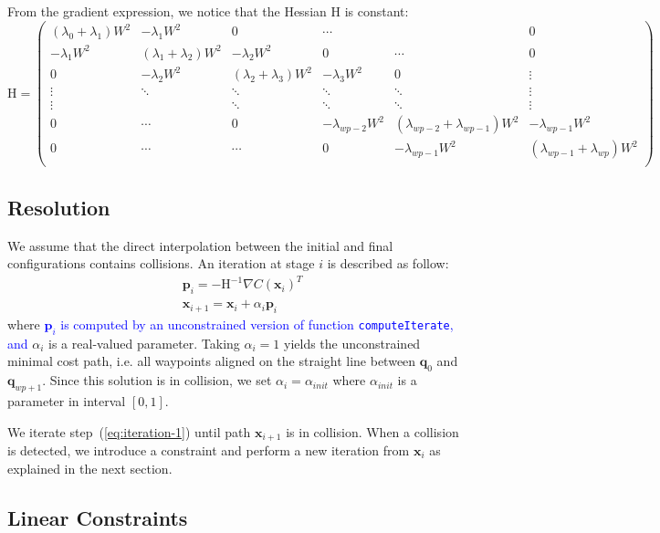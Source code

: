 \documentclass{tADR2e}
\newcommand\p{\mathbf{p}}
\newcommand\conf{\mathbf{q}}
\newcommand\xx{\mathbf{x}} %
\newcommand\cost{C}
\newcommand\weight{W}
\begin{document}
From the gradient expression, we notice that the Hessian $\mbox{H}$ is constant:
$$
\mbox{H} = \left(\begin{array}{cccccc}
(\lambda_{0}+\lambda_{1})\weight^2 & -\lambda_{1}\weight^2 & 0 & \cdots & & 0 \\
-\lambda_{1}\weight^2 & (\lambda_{1}+\lambda_{2})\weight^2 & -\lambda_{2}\weight^2 & 0 & \cdots & 0 \\
0 & -\lambda_{2}\weight^2 &  (\lambda_{2}+\lambda_{3})\weight^2 & -\lambda_{3}\weight^2 & 0 & \vdots \\
\vdots & \ddots & \ddots & \ddots & \ddots & \vdots\\
\vdots & & \ddots & \ddots & \ddots & \vdots\\
0 & \cdots  & 0 & -\lambda_{wp-2}\weight^2 & (\lambda_{wp-2}+\lambda_{wp-1})\weight^2 & -\lambda_{wp-1}\weight^2 \\
0 & \cdots &  \cdots & 0 & -\lambda_{wp-1}\weight^2 & (\lambda_{wp-1}+\lambda_{wp})\weight^2  \\
\end{array}\right)
$$

\subsection {Resolution}
We assume that the direct interpolation between the initial and final configurations contains collisions. An iteration at stage $i$ is described as follow:
\begin{equation}\label{eq:iteration-1}
\begin{split}
& \p_i =  -\mbox{H}^{-1} \nabla \cost(\xx_i)^{T} \\
& \xx_{i+1} =  \xx_{i} + \alpha_i \p_i
\end{split} 
\end{equation}
where \textcolor{blue}{$\p_i$ is computed by an unconstrained version of function \texttt{computeIterate}, and} $\alpha_i$ is a real-valued parameter. Taking $\alpha_i=1$ yields the 
unconstrained minimal cost path, i.e. all waypoints aligned on the straight line 
between $\conf_0$ and $\conf_{wp+1}$. Since this solution is in collision, we set 
$\alpha_i = \alpha_{init}$
where $\alpha_{init}$ is a parameter in interval $[0,1]$.

We iterate step~(\ref{eq:iteration-1}) until path $\xx_{i+1}$ is in collision.
When a collision is detected, we introduce a constraint and perform a new 
iteration from $\xx_i$ as explained in the next section.

\subsection{Linear Constraints}
\end{document}
